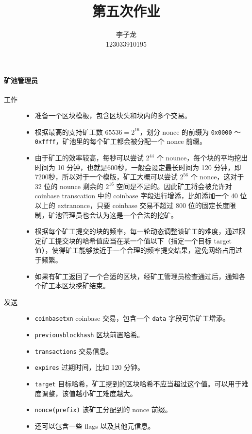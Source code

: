 \documentclass{sjtuarticle}
\title{第五次作业}
\author{李子龙\\123033910195}
\begin{document}
\maketitle
\paragraph{矿池管理员}

\begin{description}
    \item[工作] 
\begin{itemize}
    \item 准备一个区块模板，包含区块头和块内的多个交易。
    \item 根据最高的支持矿工数 $65536=2^{16}$，划分 nonce 的前缀为 \verb"0x0000" ～ \verb"0xffff"，矿池里的每个矿工都会被分配一个 nonce 前缀。
    \item 由于矿工的效率较高，每秒可以尝试 $2^{44}$ 个 nounce，每个块的平均挖出时间为 10 分钟，也就是600秒，一般会设定最长时间为 120 分钟，即7200秒，所以对于一个模版，矿工大概可以尝试 $2^{56}$ 个 nonce，这对于 32 位的 nounce 剩余的 $2^{16}$ 空间是不足的。因此矿工将会被允许对 coinbase transcation 中的 coinbase 字段进行增添，比如添加一个 40 位以上的 extranonce，只要 coinbase 交易不超过 800 位的固定长度限制，矿池管理员也会认为这是一个合法的挖矿。%
    \item 根据每个矿工提交的块的频率，每一轮动态调整该矿工的难度，通过限定矿工提交块的哈希值应当在某一个值以下（指定一个目标 target 值），使得矿工能够接近于一个合理的频率提交结果，避免网络占用过于频繁。
    \item 如果有矿工返回了一个合适的区块，经矿工管理员检查通过后，通知各个矿工本区块挖矿结束。
\end{itemize}
\item[发送] \begin{itemize}
    \item \verb"coinbasetxn" coinbase 交易，包含一个 \verb"data" 字段可供矿工增添。
    \item \verb"previousblockhash" 区块前置哈希。
    \item \verb"transactions" 交易信息。
    \item \verb"expires" 过期时间，比如 120 分钟。
    \item \verb"target" 目标哈希，矿工挖到的区块哈希不应当超过这个值。可以用于难度调整，该值越小矿工难度越大。
    \item \verb"nonce(prefix)" 该矿工分配到的 nonce 前缀。
    \item 还可以包含一些 flags 以及其他元信息。
\end{itemize}
\end{description}
\end{document}
